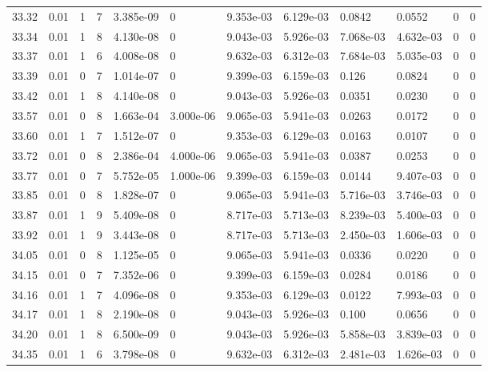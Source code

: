 \documentclass[preview]{standalone}
\begin{document}
{{{{{{{{{{{{\begin{tabular}{L{1.2cm}C{1.2cm} C{0.3cm}C{0.5cm} C{1.4cm}C{1.4cm} C{1.4cm}C{1.4cm} C{1.6cm}C{1.6cm} C{1.6cm}C{1.6cm}}
  33.32  &  0.01  & 1     &  7 &  3.385e-09  & 0  &  9.353e-03&   6.129e-03& 0.0842 & 0.0552   &  0 & 0  \\ 
  33.34  &  0.01  & 1     &  8 &  4.130e-08  & 0  &  9.043e-03&   5.926e-03& 7.068e-03 & 4.632e-03   &  0 & 0  \\ 
  33.37  &  0.01  & 1     &  6 &  4.008e-08  & 0  &  9.632e-03&   6.312e-03& 7.684e-03 & 5.035e-03   &  0 & 0  \\ 
  33.39  &  0.01  & 0     &  7 &  1.014e-07  & 0  &  9.399e-03&   6.159e-03& 0.126 & 0.0824   &  0 & 0  \\ 
  33.42  &  0.01  & 1     &  8 &  4.140e-08  & 0  &  9.043e-03&   5.926e-03& 0.0351 & 0.0230   &  0 & 0  \\ 
  33.57  &  0.01  & 0     &  8 &  1.663e-04  & 3.000e-06  &  9.065e-03&   5.941e-03& 0.0263 & 0.0172   &  0 & 0  \\ 
  33.60  &  0.01  & 1     &  7 &  1.512e-07  & 0  &  9.353e-03&   6.129e-03& 0.0163 & 0.0107   &  0 & 0  \\ 
  33.72  &  0.01  & 0     &  8 &  2.386e-04  & 4.000e-06  &  9.065e-03&   5.941e-03& 0.0387 & 0.0253   &  0 & 0  \\ 
  33.77  &  0.01  & 0     &  7 &  5.752e-05  & 1.000e-06  &  9.399e-03&   6.159e-03& 0.0144 & 9.407e-03   &  0 & 0  \\ 
  33.85  &  0.01  & 0     &  8 &  1.828e-07  & 0  &  9.065e-03&   5.941e-03& 5.716e-03 & 3.746e-03   &  0 & 0  \\ 
  33.87  &  0.01  & 1     &  9 &  5.409e-08  & 0  &  8.717e-03&   5.713e-03& 8.239e-03 & 5.400e-03   &  0 & 0  \\ 
  33.92  &  0.01  & 1     &  9 &  3.443e-08  & 0  &  8.717e-03&   5.713e-03& 2.450e-03 & 1.606e-03   &  0 & 0  \\ 
  34.05  &  0.01  & 0     &  8 &  1.125e-05  & 0  &  9.065e-03&   5.941e-03& 0.0336 & 0.0220   &  0 & 0  \\ 
  34.15  &  0.01  & 0     &  7 &  7.352e-06  & 0  &  9.399e-03&   6.159e-03& 0.0284 & 0.0186   &  0 & 0  \\ 
  34.16  &  0.01  & 1     &  7 &  4.096e-08  & 0  &  9.353e-03&   6.129e-03& 0.0122 & 7.993e-03   &  0 & 0  \\ 
  34.17  &  0.01  & 1     &  8 &  2.190e-08  & 0  &  9.043e-03&   5.926e-03& 0.100 & 0.0656   &  0 & 0  \\ 
  34.20  &  0.01  & 1     &  8 &  6.500e-09  & 0  &  9.043e-03&   5.926e-03& 5.858e-03 & 3.839e-03   &  0 & 0  \\ 
  34.35  &  0.01  & 1     &  6 &  3.798e-08  & 0  &  9.632e-03&   6.312e-03& 2.481e-03 & 1.626e-03   &  0 & 0  \\ 

\end{tabular}}}}}}}}}}}}}
\end{document}
